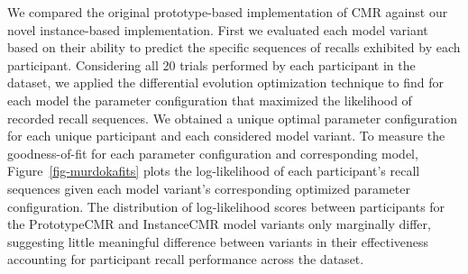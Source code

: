 \documentclass[
  letterpaper,
  DIV=11]{article}
\begin{document}
We compared the original prototype-based implementation of CMR against
our novel instance-based implementation. First we evaluated each model
variant based on their ability to predict the specific sequences of
recalls exhibited by each participant. Considering all 20 trials
performed by each participant in the dataset, we applied the
differential evolution optimization technique to find for each model the
parameter configuration that maximized the likelihood of recorded recall
sequences. We obtained a unique optimal parameter configuration for each
unique participant and each considered model variant. To measure the
goodness-of-fit for each parameter configuration and corresponding
model, Figure~\ref{fig-murdokafits} plots the log-likelihood of each
participant's recall sequences given each model variant's corresponding
optimized parameter configuration. The distribution of log-likelihood
scores between participants for the PrototypeCMR and InstanceCMR model
variants only marginally differ, suggesting little meaningful difference
between variants in their effectiveness accounting for participant
recall performance across the dataset.
\end{document}
